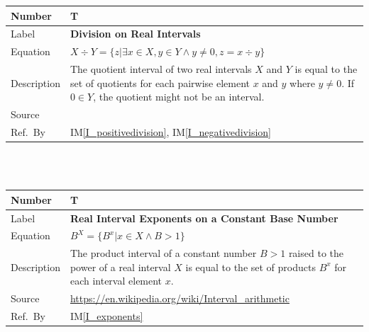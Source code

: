 \documentclass[12pt]{article}
\newcommand{\colAwidth}{0.13\textwidth}
\newcommand{\colBwidth}{0.82\textwidth}
\newcounter{theorynum} %
\newcommand{\iref}[1]{IM\ref{#1}}
\begin{document}
\noindent
\begin{minipage}{\textwidth}
	\renewcommand*{\arraystretch}{1.5}
	\begin{tabular}{| p{\colAwidth} | p{\colBwidth}|}
		\hline
		\rowcolor[gray]{0.9}
		Number& T{theorynum}\thetheorynum 
		\label{T_division}\\
		\hline
		Label&\bf Division on Real Intervals\\
		\hline
		Equation&  $X \div Y = \{z | \exists x \in X, y \in Y \wedge y \neq 0, 
		z = x \div y\}$\\
		\hline
		Description & The quotient interval of two real intervals $X$ and $Y$ 
		is equal to the set of quotients for each pairwise element $x$ and $y$ 
		where $y \neq 0$. If $0 \in Y$, the quotient might not be an interval.\\
		\hline
		Source & \citet{intervalarithmetic}\\
		\hline
		Ref.\ By & \iref{I_positivedivision}, \iref{I_negativedivision}\\
		\hline
	\end{tabular}
\end{minipage}\\

~\newline

\noindent
\begin{minipage}{\textwidth}
	\renewcommand*{\arraystretch}{1.5}
	\begin{tabular}{| p{\colAwidth} | p{\colBwidth}|}
		\hline
		\rowcolor[gray]{0.9}
		Number& T{theorynum}\thetheorynum 
		\label{T_exponents}\\
		\hline
		Label&\bf Real Interval Exponents on a Constant Base Number\\
		\hline
		Equation&  $B^X = \{B^x | x \in X \wedge B > 1\}$\\
		\hline
		Description & The product interval of a constant number $B > 1$ raised 
		to the power of a real interval $X$ is equal to the set of products 
		$B^x$ for each interval element $x$.\\
		\hline
		Source & \url{https://en.wikipedia.org/wiki/Interval_arithmetic}\\
		\hline
		Ref.\ By & \iref{I_exponents}\\
		\hline
	\end{tabular}
\end{minipage}\\

~\newline
\end{document}
